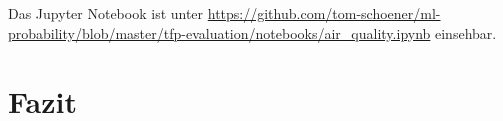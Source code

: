 \documentclass[12pt]{article}
\begin{document}
Das Jupyter Notebook ist unter \url{https://github.com/tom-schoener/ml-probability/blob/master/tfp-evaluation/notebooks/air_quality.ipynb} einsehbar.

\section{Fazit}


\newpage

%
\end{document}
